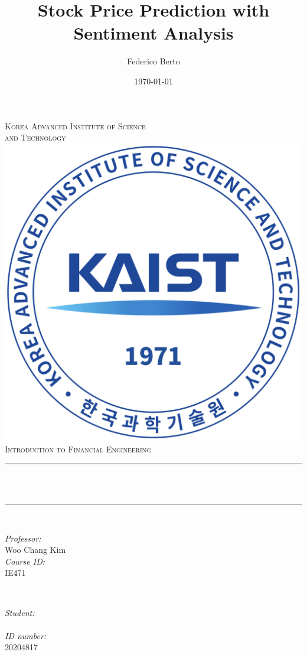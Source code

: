 \documentclass[12pt]{article}
\title{Stock Price Prediction with Sentiment Analysis}
\author{Federico Berto}
\date{\today}
\makeatletter
\newcommand{\professor}{Woo Chang Kim}
\newcommand{\studentid}{20204817}
\newcommand{\coursename}{Introduction to Financial Engineering}
\newcommand{\courseid}{IE471}
\newcommand{\firstuniversityline}{Korea Advanced Institute of Science} %
\newcommand{\seconduniversityline}{and Technology} %
\let\thetitle\@title
\let\theauthor\@author
\makeatother
\begin{document}
\begin{titlepage}
	\centering
    \textsc{\LARGE  \firstuniversityline \\ \smallskip \seconduniversityline}\\[1 cm]	%
    \includegraphics[scale = 0.18]{images/university_main_logo.png}\\[1.5 cm]	%
    
	\textsc{\Large \coursename}\\[0.5 cm]
	\rule{\linewidth}{0.2 mm} \\[0.4 cm]
	{ \huge \bfseries {\thetitle}}\\
	\rule{\linewidth}{0.2 mm} \\[1.5 cm]
	
	\begin{minipage}{0.5\textwidth}
		\begin{flushleft} \large
			\emph{Professor:}\\
		    \professor \\ [0.5cm]
            \emph{Course ID:}\\
            \courseid
			\end{flushleft}
			\end{minipage}~
			\begin{minipage}{0.4\textwidth}
			\begin{flushright} \large
			\emph{Student:} \\
			\theauthor \\[0.5cm]
			\emph{ID number:}\\
			\studentid \\
		\end{flushright}
	\end{minipage}\\[2 cm]
	
\end{titlepage}
\end{document}
